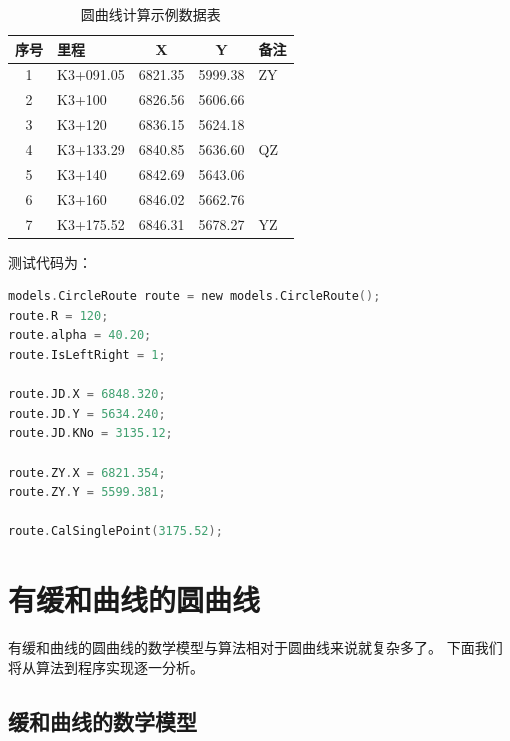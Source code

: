 \begin{table}[htbp]
\centering
\caption{圆曲线计算示例数据表}
\label{tab:YRoute}
\begin{tabular}{clccl}
\hline
序号  &  里程    &     X       &   Y	 & 备注 \\
\hline
1    & K3+091.05 &  6821.35 & 5999.38 &  ZY \\
2    & K3+100	    & 	 6826.56 & 5606.66 &        \\
3    & K3+120	    &  6836.15 & 5624.18 &        \\
4    & K3+133.29 &  6840.85 & 5636.60 &  QZ \\
5    & K3+140	    & 	 6842.69 & 5643.06 &        \\
6    & K3+160	    &  6846.02 & 5662.76 &        \\
7    & K3+175.52 &  6846.31 & 5678.27 &  YZ  \\
\hline
\end{tabular}
\end{table}

测试代码为：
\begin{lstlisting}[language=C]
models.CircleRoute route = new models.CircleRoute();
route.R = 120;
route.alpha = 40.20;
route.IsLeftRight = 1;

route.JD.X = 6848.320;
route.JD.Y = 5634.240;
route.JD.KNo = 3135.12;

route.ZY.X = 6821.354;
route.ZY.Y = 5599.381;

route.CalSinglePoint(3175.52);
\end{lstlisting}

\section{有缓和曲线的圆曲线}

有缓和曲线的圆曲线的数学模型与算法相对于圆曲线来说就复杂多了。
下面我们将从算法到程序实现逐一分析。

\subsection{缓和曲线的数学模型}


